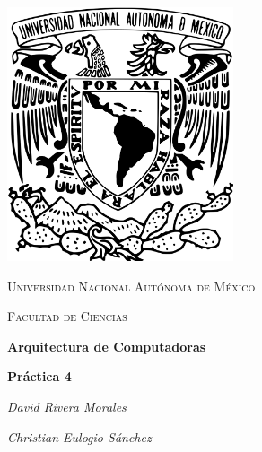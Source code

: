\begin{titlepage}
    \centering
    \includegraphics[width=0.50\textwidth]{unam_logo.png}\par
    \vspace{1cm}
    {\scshape\Large Universidad Nacional Autónoma de México \par}
    \vspace{1cm}
    {\scshape\Large Facultad de Ciencias \par}
    \vspace{1.5cm}
    {\huge\bfseries Arquitectura de Computadoras \par}
    {\huge\bfseries Práctica 4 \par}
    \vspace{2cm}
    {\Large\itshape David Rivera Morales\par}
    {\Large \itshape Christian Eulogio Sánchez \par}
    \vfill
  
\end{titlepage}

